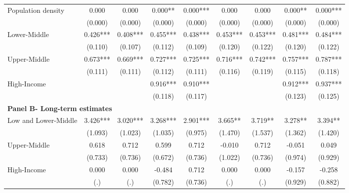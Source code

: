 \begin{tabular}{lcccccccc}
Population density  &       0.000   &       0.000   &       0.000** &       0.000***&       0.000   &       0.000   &       0.000** &       0.000***\\
                    &     (0.000)   &     (0.000)   &     (0.000)   &     (0.000)   &     (0.000)   &     (0.000)   &     (0.000)   &     (0.000)   \\
Lower-Middle        &       0.426***&       0.408***&       0.455***&       0.438***&       0.453***&       0.453***&       0.481***&       0.484***\\
                    &     (0.110)   &     (0.107)   &     (0.112)   &     (0.109)   &     (0.120)   &     (0.122)   &     (0.120)   &     (0.122)   \\
Upper-Middle        &       0.673***&       0.669***&       0.727***&       0.725***&       0.716***&       0.742***&       0.757***&       0.787***\\
                    &     (0.111)   &     (0.111)   &     (0.112)   &     (0.111)   &     (0.116)   &     (0.119)   &     (0.115)   &     (0.118)   \\
High-Income         &               &               &       0.916***&       0.910***&               &               &       0.912***&       0.937***\\
                    &               &               &     (0.118)   &     (0.117)   &               &               &     (0.123)   &     (0.125)   \\
\midrule
 
\multicolumn{9}{l}{\textbf{Panel B- Long-term estimates}} \\
Low and Lower-Middle&       3.426***&       3.020***&       3.268***&       2.901***&       3.665** &       3.719** &       3.278** &       3.394** \\
                    &     (1.093)   &     (1.023)   &     (1.035)   &     (0.975)   &     (1.470)   &     (1.537)   &     (1.362)   &     (1.420)   \\
\midrule
 
Upper-Middle        &       0.618   &       0.712   &       0.599   &       0.712   &      -0.010   &       0.712   &      -0.051   &       0.049   \\
                    &     (0.733)   &     (0.736)   &     (0.672)   &     (0.736)   &     (1.022)   &     (0.736)   &     (0.974)   &     (0.929)   \\
 
High-Income         &       0.000   &       0.000   &      -0.484   &       0.712   &       0.000   &       0.000   &      -0.157   &      -0.258   \\
                    &         (.)   &         (.)   &     (0.782)   &     (0.736)   &         (.)   &         (.)   &     (0.929)   &     (0.882)   \\
 

\end{tabular}
